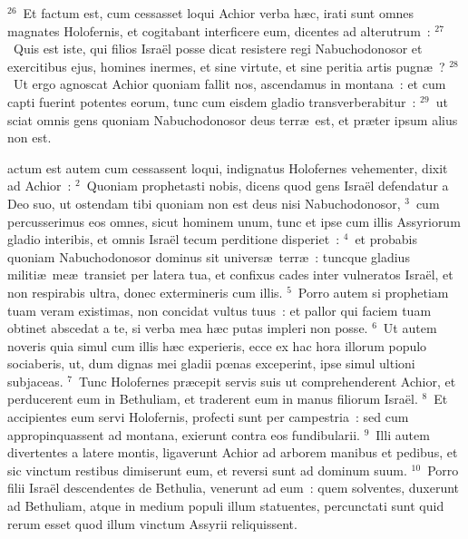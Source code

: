 ${}^{26}$~Et factum est, cum cessasset loqui Achior verba h\ae c, irati sunt omnes magnates Holofernis, et cogitabant interficere eum, dicentes ad alterutrum~:
${}^{27}$~Quis est iste, qui filios Isra\"el posse dicat resistere regi Nabuchodonosor et exercitibus ejus, homines inermes, et sine virtute, et sine peritia artis pugn\ae~?
${}^{28}$~Ut ergo agnoscat Achior quoniam fallit nos, ascendamus in montana~: et cum capti fuerint potentes eorum, tunc cum eisdem gladio transverberabitur~:
${}^{29}$~ut sciat omnis gens quoniam Nabuchodonosor deus terr\ae\ est, et pr\ae ter ipsum alius non est.

\bchapter
{}actum est autem cum cessassent loqui, indignatus Holofernes vehementer, dixit ad Achior~:
${}^{2}$~Quoniam prophetasti nobis, dicens quod gens Isra\"el defendatur a Deo suo, ut ostendam tibi quoniam non est deus nisi Nabuchodonosor,
${}^{3}$~cum percusserimus eos omnes, sicut hominem unum, tunc et ipse cum illis Assyriorum gladio interibis, et omnis Isra\"el tecum perditione disperiet~:
${}^{4}$~et probabis quoniam Nabuchodonosor dominus sit univers\ae\ terr\ae~: tuncque gladius militi\ae\ me\ae\ transiet per latera tua, et confixus cades inter vulneratos Isra\"el, et non respirabis ultra, donec extermineris cum illis.
${}^{5}$~Porro autem si prophetiam tuam veram existimas, non concidat vultus tuus~: et pallor qui faciem tuam obtinet abscedat a te, si verba mea h\ae c putas impleri non posse.
${}^{6}$~Ut autem noveris quia simul cum illis h\ae c experieris, ecce ex hac hora illorum populo sociaberis, ut, dum dignas mei gladii pœnas exceperint, ipse simul ultioni subjaceas.
${}^{7}$~Tunc Holofernes pr\ae cepit servis suis ut comprehenderent Achior, et perducerent eum in Bethuliam, et traderent eum in manus filiorum Isra\"el.
${}^{8}$~Et accipientes eum servi Holofernis, profecti sunt per campestria~: sed cum appropinquassent ad montana, exierunt contra eos fundibularii.
${}^{9}$~Illi autem divertentes a latere montis, ligaverunt Achior ad arborem manibus et pedibus, et sic vinctum restibus dimiserunt eum, et reversi sunt ad dominum suum.
${}^{10}$~Porro filii Isra\"el descendentes de Bethulia, venerunt ad eum~: quem solventes, duxerunt ad Bethuliam, atque in medium populi illum statuentes, percunctati sunt quid rerum esset quod illum vinctum Assyrii reliquissent.



